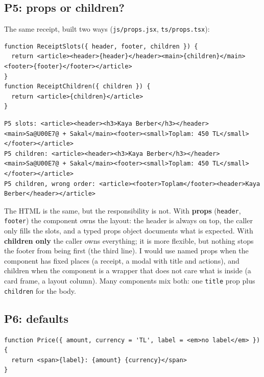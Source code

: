 \subsection{P5: props or children?}\label{p5-props-or-children}

The same receipt, built two ways (\passthrough{\lstinline!js/props.jsx!}, \passthrough{\lstinline!ts/props.tsx!}):

\begin{lstlisting}
function ReceiptSlots({ header, footer, children }) {
  return <article><header>{header}</header><main>{children}</main><footer>{footer}</footer></article>
}
function ReceiptChildren({ children }) {
  return <article>{children}</article>
}
\end{lstlisting}

\begin{lstlisting}
P5 slots: <article><header><h3>Kaya Berber</h3></header><main>Sa@U00E7@ + Sakal</main><footer><small>Toplam: 450 TL</small></footer></article>
P5 children: <article><header><h3>Kaya Berber</h3></header><main>Sa@U00E7@ + Sakal</main><footer><small>Toplam: 450 TL</small></footer></article>
P5 children, wrong order: <article><footer>Toplam</footer><header>Kaya Berber</header></article>
\end{lstlisting}

The HTML is the same, but the responsibility is not. With \textbf{props} (\passthrough{\lstinline!header!}, \passthrough{\lstinline!footer!}) the component owns the layout:
the header is always on top, the caller only fills the slots, and a typed props object documents what is expected.
With \textbf{children only} the caller owns everything; it is more flexible, but nothing stops the footer from being first
(the third line). I would use named props when the component has fixed places (a receipt, a modal with title and actions),
and children when the component is a wrapper that does not care what is inside (a card frame, a layout column).
Many components mix both: one \passthrough{\lstinline!title!} prop plus \passthrough{\lstinline!children!} for the body.

\subsection{P6: defaults}\label{p6-defaults}

\begin{lstlisting}
function Price({ amount, currency = 'TL', label = <em>no label</em> }) {
  return <span>{label}: {amount} {currency}</span>
}
\end{lstlisting}


